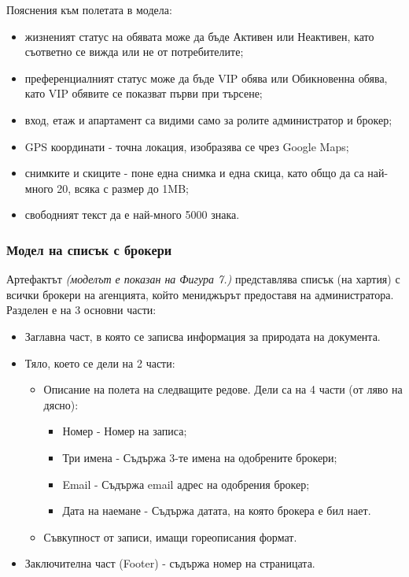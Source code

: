 \documentclass[a4paper]{article}
\begin{document}
		Пояснения към полетата в модела:
		\begin{itemize}
		\item жизненият статус на обявата може да бъде Активен или Неактивен, като съответно се вижда или не от потребителите;
		\item преференциалният статус може да бъде VIP обява или Обикновенна обява, като VIP обявите се показват първи при търсене;
		\item вход, етаж и апартамент са видими само за ролите администратор и брокер;
		\item GPS координати - точна локация, изобразява се чрез Google Maps;
		\item снимките и скиците - поне една снимка и една скица, като общо да са най-много 20, всяка с размер до 1MB;
		\item свободният текст да е най-много 5000 знака.
		\end{itemize}

\subsubsection{Модел на списък с брокери}		

Артефактът \emph{(моделът е показан на Фигура 7.)} представлява списък (на хартия) с всички брокери на агенцията, който мениджърът предоставя на администратора. Разделен е на 3 основни части:
	\begin{itemize}
	\item Заглавна част, в която се записва информация за природата на документа.
	\item {Тяло, което се дели на 2 части:
		\begin{itemize}
		\item {Описание на полета на следващите редове. Дели са на 4 части (от ляво на дясно):
			\begin{itemize}
			\item Номер - Номер на записа;
			\item Три имена - Съдържа 3-те имена на одобрените брокери;
			\item Email - Съдържа email адрес на одобрения брокер;
			\item Дата на наемане - Съдържа датата, на която брокера е бил нает.
			\end{itemize}					
		}
		\item Съвкупност от записи, имащи гореописания формат.
		\end{itemize}
		}
	\item Заключителна част (Footer) - съдържа номер на страницата.
	\end{itemize}		
\end{document}
